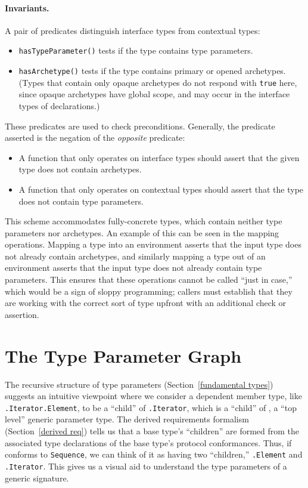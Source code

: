 \documentclass[../generics]{subfiles}
\begin{document}
\paragraph{Invariants.} A pair of predicates distinguish interface types from contextual types:
\begin{itemize}
\item \texttt{hasTypeParameter()} tests if the type contains type parameters.
\item \texttt{hasArchetype()} tests if the type contains primary or opened archetypes. (Types that contain only opaque archetypes do not respond with \texttt{true} here, since opaque archetypes have global scope, and may occur in the interface types of declarations.)
\end{itemize}
These predicates are used to check preconditions. Generally, the predicate asserted is the negation of the \emph{opposite} predicate:
\begin{itemize}
\item A function that only operates on interface types should assert that the given type does not contain archetypes.
\item A function that only operates on contextual types should assert that the type does not contain type parameters.
\end{itemize}
This scheme accommodates fully-concrete types, which contain neither type parameters nor archetypes. An example of this can be seen in the mapping operations. Mapping a type into an environment asserts that the input type does not already contain archetypes, and similarly mapping a type out of an environment asserts that the input type does not already contain type parameters. This ensures that these operations cannot be called ``just in case,'' which would be a sign of sloppy programming; callers must establish that they are working with the correct sort of type upfront with an additional check or assertion.

\section{The Type Parameter Graph}\label{type parameter graph}

The recursive structure of type parameters (Section~\ref{fundamental types}) suggests an intuitive viewpoint where we consider a dependent member type, like \texttt{.Iterator.Element}, to be a ``child'' of \texttt{.Iterator}, which is a ``child'' of , a ``top level'' generic parameter type. The derived requirements formalism (Section~\ref{derived req}) tells us that a base type's ``children'' are formed from the associated type declarations of the base type's protocol conformances. Thus, if  conforms to \texttt{Sequence}, we can think of it as having two ``children,'' \texttt{.Element} and \texttt{.Iterator}. This gives us a visual aid to understand the type parameters of a generic signature.
\end{document}
